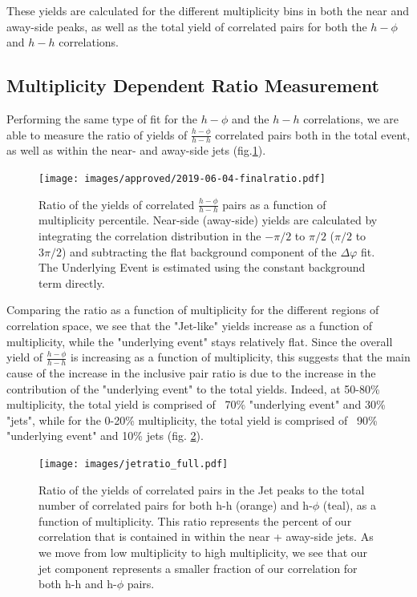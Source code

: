 \documentclass[ALICE,manyauthors]{ALICE_analysis_notes}
\begin{document}
These yields are calculated for the different multiplicity bins in both the near and away-side peaks, as well as the total yield of correlated pairs for both the $h-\phi$ and $h-h$ correlations.


\subsection{Multiplicity Dependent Ratio Measurement}

Performing the same type of fit for the $h-\phi$ and the $h-h$ correlations, we are able to measure the ratio of yields of $\frac{h-\phi}{h-h}$ correlated pairs both in the total event, as well as within the near- and away-side jets (fig.\ref{ratioplot}).

\begin{figure}[ht]
\centering
\texttt{[image: images/approved/2019-06-04-finalratio.pdf]}
\caption{Ratio of the yields of correlated $\frac{h-\phi}{h-h}$ pairs as a function of multiplicity percentile.  Near-side (away-side) yields are calculated by integrating the correlation distribution in the $-\pi/2$ to $\pi/2$ ($\pi/2$ to $3\pi/2$) and subtracting the flat background component of the $\Delta\varphi$ fit. The Underlying Event is estimated using the constant background term directly.}
\label{ratioplot}
\end{figure}

Comparing the ratio as a function of multiplicity for the different regions of correlation space, we see that the "Jet-like" yields increase as a function of multiplicity, while the "underlying event" stays relatively flat.  Since the overall yield of $\frac{h-\phi}{h-h}$ is increasing as a function of multiplicity, this suggests that the main cause of the increase in the inclusive pair ratio is due to the increase in the contribution of the "underlying event" to the total yields.  Indeed, at 50-80\% multiplicity, the total yield is comprised of ~70\% "underlying event" and 30\% "jets", while for the 0-20\% multiplicity, the total yield is comprised of ~90\% "underlying event" and 10\% jets (fig. \ref{jetratiofull}).

\begin{figure}[ht]
\centering
\texttt{[image: images/jetratio\_full.pdf]}
\caption{Ratio of the yields of correlated pairs in the Jet peaks to the total number of correlated pairs for both h-h (orange) and h-$\phi$ (teal), as a function of multiplicity.  This ratio represents the percent of our correlation that is contained in within the near + away-side jets. As we move from low multiplicity to high multiplicity, we see that our jet component represents a smaller fraction of our correlation for both h-h and h-$\phi$ pairs.}
\label{jetratiofull}
\end{figure}
\end{document}
